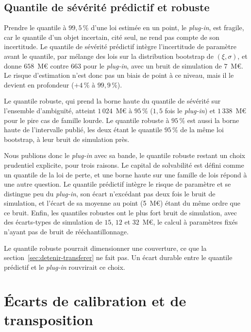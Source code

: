 \subsection{Quantile de sévérité prédictif et robuste}
\label{sec:predictive-robuste}
\label{sec:posture-retenue}

Prendre le quantile à $99{,}5\,\%$ d'une loi estimée en un point, le \emph{plug-in}, est fragile,
car le quantile d'un objet incertain, cité seul, ne rend pas compte de son incertitude. Le quantile
de sévérité prédictif intègre
l'incertitude de paramètre avant le quantile, par mélange des lois sur la distribution bootstrap de
$(\xi,\sigma)$, et donne $658$~M\euro{} contre $663$ pour le \emph{plug-in}, avec un bruit de
simulation de $7$~M\euro{}. Le risque d'estimation n'est donc pas un biais de point à ce niveau, mais
il le devient en profondeur ($+4\,\%$ à $99{,}9\,\%$).

Le quantile robuste, qui prend la borne haute du quantile de sévérité sur l'ensemble d'ambiguïté, atteint
$1\,024$~M\euro{} à $95\,\%$ ($1{,}5$ fois le \emph{plug-in}) et $1\,338$~M\euro{} pour le pire cas
de famille lourde. Le quantile robuste à $95\,\%$ est aussi la borne haute de l'intervalle publié, les deux
étant le quantile $95\,\%$ de la même loi bootstrap, à leur bruit de simulation près.

Nous publions donc le \emph{plug-in} avec sa bande, le quantile robuste restant un choix prudentiel explicite,
pour trois raisons. Le capital de solvabilité est défini comme un quantile de la loi de perte, et une
borne haute sur une famille de lois répond à une autre question. Le quantile prédictif intègre le risque de paramètre et
se distingue peu du \emph{plug-in}, son écart n'excédant pas deux fois le bruit de simulation, et l'écart de
sa moyenne au point (5~M\euro) étant du même ordre que ce bruit. Enfin, les quantiles robustes ont le plus fort bruit de simulation, avec des écarts-types de simulation de $15$, $12$ et
$32$~M\euro{}, le calcul à paramètres fixés n'ayant pas de bruit de rééchantillonnage.

Le quantile robuste pourrait dimensionner une couverture, ce que la section~\ref{sec:detenir-transferer} ne fait pas. Un écart durable entre le quantile prédictif et le \emph{plug-in} rouvrirait ce choix.


\section{Écarts de calibration et de transposition}

